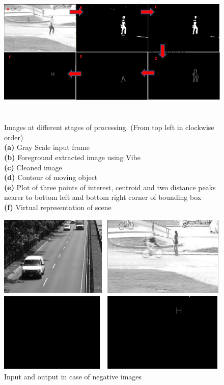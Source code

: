 \begin{figure}[!t]
\centering
\includegraphics[height=200pt]{Figures/pipeline_images}
\caption{Images at different stages of processing. (From top left in
	clockwise order)\\
	\textbf{(a)} Gray Scale input frame\\
	\textbf{(b)} Foreground extracted image using Vibe\\
	\textbf{(c)} Cleaned image\\
	\textbf{(d)} Contour of moving object\\
	\textbf{(e)} Plot of three points of interest, centroid and two distance
peaks nearer to bottom left and bottom right corner of bounding box\\
\textbf{(f)} Virtual representation of scene} 
\label{pipeline_images}
\end{figure}
\begin{figure}[!b]
\centering
\includegraphics[height=220pt]{Figures/negative_inputs}
\caption{Input and output in case of negative images}
\label{negative_inputs}
\end{figure}

